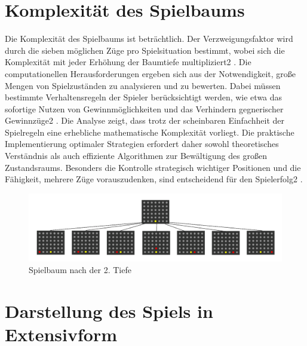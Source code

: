 \section{Komplexität des Spielbaums}
Die Komplexität des Spielbaums ist beträchtlich. Der Verzweigungsfaktor wird durch die sieben möglichen Züge pro Spielsituation bestimmt, wobei sich die Komplexität mit jeder Erhöhung der Baumtiefe multipliziert2
. Die computationellen Herausforderungen ergeben sich aus der Notwendigkeit, große Mengen von Spielzuständen zu analysieren und zu bewerten. Dabei müssen bestimmte Verhaltensregeln der Spieler berücksichtigt werden, wie etwa das sofortige Nutzen von Gewinnmöglichkeiten und das Verhindern gegnerischer Gewinnzüge2
. Die Analyse zeigt, dass trotz der scheinbaren Einfachheit der Spielregeln eine erhebliche mathematische Komplexität vorliegt. Die praktische Implementierung optimaler Strategien erfordert daher sowohl theoretisches Verständnis als auch effiziente Algorithmen zur Bewältigung des großen Zustandsraums. Besonders die Kontrolle strategisch wichtiger Positionen und die Fähigkeit, mehrere Züge vorauszudenken, sind entscheidend für den Spielerfolg2
.
\begin{figure}[H]
	\centering
	\includegraphics[width=0.7\linewidth]{"images/Bildschirmfoto 2025-01-07 um 12.01.00"}
	\caption{Spielbaum nach der 2. Tiefe}
	\label{fig:bildschirmfoto-2025-01-07-um-12}
\end{figure}




 \section{Darstellung des Spiels in Extensivform}
%
%

